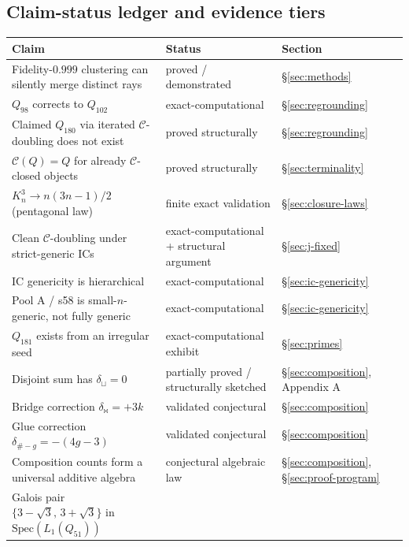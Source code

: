 \documentclass[12pt,a4paper]{article}
\theoremstyle{definition}
\theoremstyle{remark}
\newcommand{\Kn}{K_n^3}
\newcommand{\Ccls}{\mathcal{C}}             %
\newcommand{\bridge}{\mathbin{\bowtie}}     %
\newcommand{\glue}{\mathbin{\#}}            %
\begin{document}
\subsection{Claim-status ledger and evidence tiers}\label{sec:intro-ledger}

\begin{table}[H]
\centering
\small
\begin{tabular}{p{} p{} p{}}
\toprule
\textbf{Claim} & \textbf{Status} & \textbf{Section} \\
\midrule
Fidelity-$0.999$ clustering can silently merge distinct rays
  & proved / demonstrated
  & \S\ref{sec:methods} \\
$Q_{98}$ corrects to $Q_{102}$
  & exact-computational
  & \S\ref{sec:regrounding} \\
Claimed $Q_{180}$ via iterated $\Ccls$-doubling does not exist
  & proved structurally
  & \S\ref{sec:regrounding} \\
$\Ccls(Q) = Q$ for already $\Ccls$-closed objects
  & proved structurally
  & \S\ref{sec:terminality} \\
$\Kn \to n(3n{-}1)/2$ (pentagonal law)
  & finite exact validation
  & \S\ref{sec:closure-laws} \\
Clean $\Ccls$-doubling under strict-generic ICs
  & exact-computational +
    structural argument
  & \S\ref{sec:j-fixed} \\
IC genericity is hierarchical
  & exact-computational
  & \S\ref{sec:ic-genericity} \\
Pool A / s58 is small-$n$-generic, not fully generic
  & exact-computational
  & \S\ref{sec:ic-genericity} \\
$Q_{181}$ exists from an irregular seed
  & exact-computational
    exhibit
  & \S\ref{sec:primes} \\
Disjoint sum has $\delta_{\sqcup} = 0$
  & partially proved /
    structurally sketched
  & \S\ref{sec:composition},
    Appendix A \\
Bridge correction
  $\delta_{\bridge} = +3k$
  & validated conjectural
  & \S\ref{sec:composition} \\
Glue correction
  $\delta_{\glue-g} = -(4g{-}3)$
  & validated conjectural
  & \S\ref{sec:composition} \\
Composition counts form a universal additive algebra
  & conjectural algebraic law
  & \S\ref{sec:composition},
    \S\ref{sec:proof-program} \\
Galois pair
  $\{3{-}\sqrt 3,\,3{+}\sqrt 3\}$
  in $\mathrm{Spec}(L_1(Q_{51}))$

\end{tabular}
\end{table}
\end{document}
